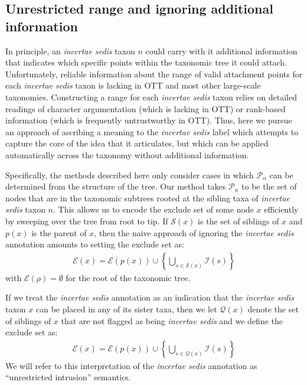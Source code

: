 \documentclass[english]{article}
\begin{document}
\subsection{Unrestricted range and ignoring additional information}
In principle, an \emph{incertae sedis} taxon $n$ could carry with it additional
    information that indicates which specific points within the taxonomic tree
    it could attach.
Unfortunately, reliable information about the range of valid attachment points
for each \emph{incertae sedis} taxon is lacking in OTT and most other large-scale
taxonomies.
Constructing a range for each \emph{incertae sedis} taxon relies on detailed
readings of character argumentation (which is lacking in OTT) or rank-based
information (which is frequently untrustworthy in OTT). Thus, here we pursue
an approach of ascribing a meaning to the \emph{incertae sedis} label which
attempts to capture the core of the idea that it articulates, but which can be
applied automatically across the taxonomy without additional information.


Specifically, the methods described here only consider cases in which 
    $\mathcal{P}_n$ can be determined from the structure of the tree.
Our method takes $\mathcal{P}_n$ to be the set of nodes that
    are in the taxonomic subtrees rooted at the sibling taxa of \emph{incertae sedis} taxon $n$.
This allows us to encode the exclude set of some node $x$ efficiently by sweeping
    over the tree from root to tip.
If $\mathcal{S}(x)$ is the set of siblings of $x$ and $p(x)$ is the parent of $x$, then
the naive approach of ignoring the \emph{incertae sedis}  annotation amounts to setting
    the exclude set as:
\begin{align}
    \mathcal{E}(x) = \mathcal{E}(p(x)) \cup \left\{ \bigcup_{s\in \mathcal{S}(x)} \mathcal{I}(s) \right\}
    \label{eq:exsetformonea-traditional}
\end{align}
with $\mathcal{E}(\rho) = \emptyset$ for the root of the taxonomic tree.

If we treat the  \emph{incertae sedis} annotation as an indication that the 
    \emph{incertae sedis} taxon $x$ can be placed in any of its sister taxa, then
    we let $\mathcal{Q}(x)$ denote the set of siblings of $x$ that are not
    flagged as being \emph{incertae sedis} and we define the exclude set as:
\begin{align}
    \mathcal{E}(x) = \mathcal{E}(p(x)) \cup \left\{ \bigcup_{s\in \mathcal{Q}(x)} \mathcal{I}(s)\right\}
    \label{eq:exsetformonea}
\end{align}
We will refer to this interpretation of the \emph{incertae sedis} annotation as ``unrestricted
    intrusion'' semantics.
\end{document}
